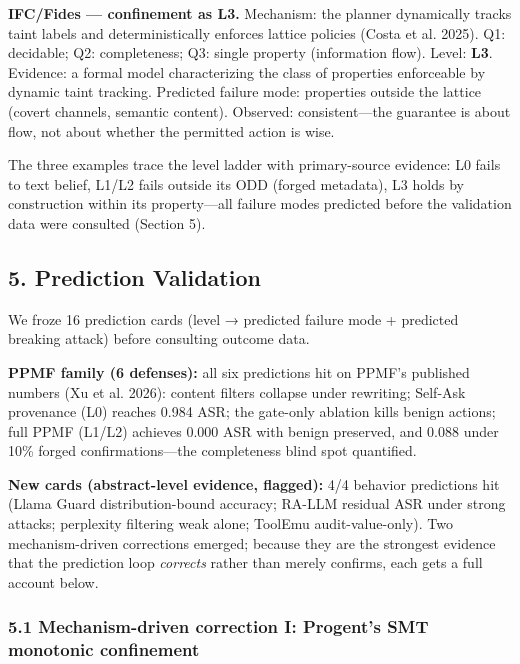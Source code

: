 \documentclass[

]{article}
\begin{document}
\textbf{IFC/Fides --- confinement as L3.} Mechanism: the planner dynamically tracks taint labels and deterministically enforces lattice policies ({Costa et al.} 2025). Q1: decidable; Q2: completeness; Q3: single property (information flow). Level: \textbf{L3}. Evidence: a formal model characterizing the class of properties enforceable by dynamic taint tracking. Predicted failure mode: properties outside the lattice (covert channels, semantic content). Observed: consistent---the guarantee is about flow, not about whether the permitted action is wise.



The three examples trace the level ladder with primary-source evidence: L0 fails to text belief, L1/L2 fails outside its ODD (forged metadata), L3 holds by construction within its property---all failure modes predicted before the validation data were consulted (Section 5).



\subsection{5. Prediction Validation}\label{prediction-validation}



We froze 16 prediction cards (level → predicted failure mode + predicted breaking attack) before consulting outcome data.



\textbf{PPMF family (6 defenses):} all six predictions hit on PPMF's published numbers (Xu et al. 2026): content filters collapse under rewriting; Self-Ask provenance (L0) reaches 0.984 ASR; the gate-only ablation kills benign actions; full PPMF (L1/L2) achieves 0.000 ASR with benign preserved, and 0.088 under 10\% forged confirmations---the completeness blind spot quantified.



\textbf{New cards (abstract-level evidence, flagged):} 4/4 behavior predictions hit (Llama Guard distribution-bound accuracy; RA-LLM residual ASR under strong attacks; perplexity filtering weak alone; ToolEmu audit-value-only). Two mechanism-driven corrections emerged; because they are the strongest evidence that the prediction loop \emph{corrects} rather than merely confirms, each gets a full account below.



\subsubsection{5.1 Mechanism-driven correction I: Progent's SMT monotonic confinement}\label{mechanism-driven-correction-i-progents-smt-monotonic-confinement}
\end{document}
